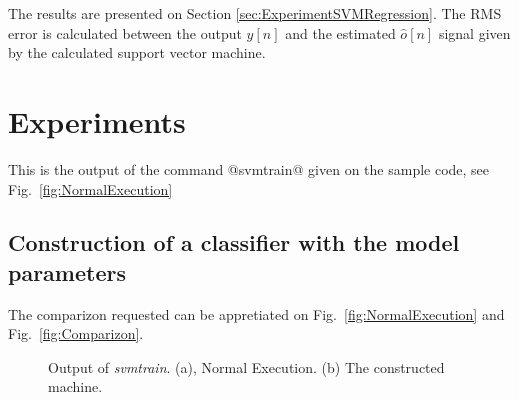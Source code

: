 \documentclass[letterpaper, 10 pt, conference]{ieeeconf}  %
\begin{document}
The results are presented on Section  \ref{sec:ExperimentSVMRegression}. The RMS error is calculated between the output $y[n]$ and the estimated $\hat{o}[n]$ signal given by the calculated support vector machine.

\section{Experiments}
\label{sec:experiments}

This is the output of the command  @svmtrain@ given on the sample code, see Fig.~\ref{fig:NormalExecution}


\subsection{Construction of a classifier with the model parameters}
\label{sec:ExperimentConstructionClassifierModelParameters}

The comparizon requested can be appretiated on Fig.~\ref{fig:NormalExecution} and Fig.~\ref{fig:Comparizon}. 


\begin{figure}[ht!]
 \begin{center}
         \caption{Output of \emph{svmtrain}. (a), Normal Execution. (b) The constructed machine.}
 \end{center}
\end{figure}
\end{document}
